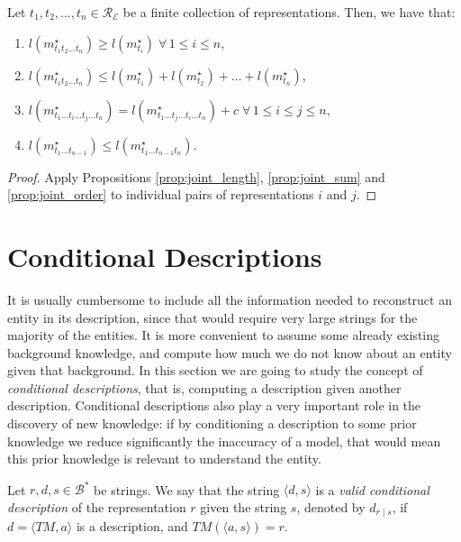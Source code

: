 \begin{proposition}
\label{prop:joint_multiple_topics}
Let $t_1, t_2, \ldots, t_n \in \mathcal{R}_\mathcal{E}$ be a finite collection of representations. Then, we have that:

\renewcommand{\theenumi}{\roman{enumi}}
\begin{enumerate}
\item $l(m_{t_1 t_2 \ldots t_n}^\star) \geq l(m_ {t_i}^\star) \; \forall \, 1 \leq i \leq n$,
\item $l(m_{t_1 t_2 \ldots t_n}^\star) \leq l(m_ {t_1}^\star) + l(m_ {t_2}^\star) + \ldots + l(m_ {t_n}^\star)$,
\item $l(m_{t_1 \ldots t_i \ldots t_j \ldots t_n}^\star) = l(m_{t_1 \ldots t_j \ldots t_i \ldots t_n}^\star) + c \; \forall \, 1 \leq i \leq j \leq n$,
\item $l(m_{t_1 \ldots t_{n-1}}^\star) \leq l(m_{t_1 \ldots t_{n-1} t_n}^\star)$.
\end{enumerate}
\end{proposition}
\begin{proof}
Apply Propositions \ref{prop:joint_length}, \ref{prop:joint_sum} and \ref{prop:joint_order} to individual pairs of representations $i$ and $j$.
\end{proof}

%
%

\section{Conditional Descriptions}

It is usually cumbersome to include all the information needed to reconstruct an entity in its description, since that would require very large strings for the majority of the entities. It is more convenient to assume some already existing background knowledge, and compute how much we do not know about an entity given that background. In this section we are going to study the concept of \emph{conditional descriptions}, that is, computing a description given another description. Conditional descriptions also play a very important role in the discovery of new knowledge: if by conditioning a description to some prior knowledge we reduce significantly the inaccuracy of a model, that would mean this prior knowledge is relevant to understand the entity.

\begin{definition}
\label{def:conditional_description}
Let $r, d, s \in \mathcal{B}^\ast$ be strings. We say that the string $\langle d, s \rangle$ is a \emph{valid conditional description} of the representation $r$ given the string $s$, denoted by $d_{r \mid s}$, if $d = \langle TM, a \rangle$ is a description, and $TM \left(\langle a, s \rangle \right) = r$.
\end{definition}

